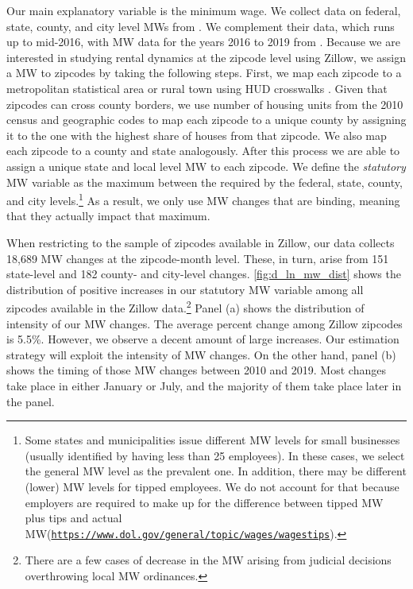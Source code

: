 Our main explanatory variable is the minimum wage. We collect data on federal, state, 
county, and city level MWs from \textcite{VaghulZipperer2016}. We complement their data,
which runs up to mid-2016, with MW data for the years 2016 to 2019 from 
\textcite{BerkeleyLaborCenter}. Because  we are interested in studying rental dynamics at 
the zipcode level using Zillow, we assign a MW to zipcodes by taking the following steps.
First, we map each zipcode to a metropolitan statistical area or rural town using HUD 
crosswalks \parencite{hudCrosswalks}. Given that zipcodes can cross county borders, we use 
number of housing units from the 2010 census and geographic codes to map each zipcode to 
a unique county by assigning it to the one with the highest share of houses from that 
zipcode. We also map each zipcode to a county and state analogously. After this process 
we are able to assign a unique state and local level MW to each zipcode. We define the 
\textit{statutory} MW variable as the maximum between the required by the federal, state, 
county, and city levels.\footnote{Some states and municipalities issue different MW levels 
	for small businesses (usually identified by having less than 25 employees). In these cases, 
	we select the general MW level as the prevalent one. In addition, there may be different (lower) MW
levels for tipped employees. We do not account for that because employers are required to make up
for the difference between tipped MW plus tips and actual MW(\href{https://www.dol.gov/general/topic/wages
	/wagestips}{\texttt{https://www.dol.gov/general/topic/wages/wagestips}}).}
As a result, we only use MW changes that are binding, meaning that they actually impact 
that maximum. 

When restricting to the sample of zipcodes available in Zillow, our data collects 18,689 MW %
changes at the zipcode-month level. These, in turn, arise from 151 state-level and 182 
county- and city-level changes. 
\autoref{fig:d_ln_mw_dist} shows the distribution of positive increases in our 
statutory MW variable among all zipcodes available in the Zillow data.\footnote{There
	are a few cases of decrease in the MW arising from judicial decisions overthrowing 
	local MW ordinances.}
Panel (a) shows the distribution of intensity of our MW changes. The average percent 
change among Zillow zipcodes is 5.5\%. %
However, we observe a decent amount of large increases. Our estimation strategy will
exploit the intensity of MW changes. On the other hand, panel (b) shows the timing of 
those MW changes between 2010 and 2019. Most changes take place in either January or
July, and the majority of them take place later in the panel.

